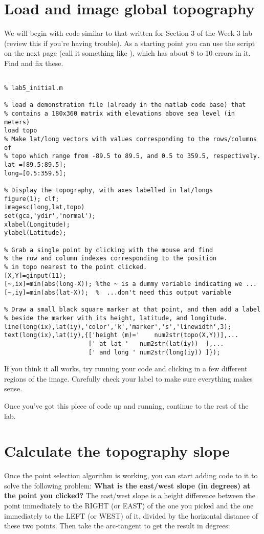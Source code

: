 \documentclass[letterpaper,12pt]{article}
\begin{document}
\section{Load and image global topography}
\label{sec:load}

We will begin with  code similar to that  written 
for Section 3 of the Week 3 lab (review this if you're having trouble). As a starting point you can
use the script  on the next page (call it something like ),
which has about 8 to 10 errors in it. Find and fix these.
\begin{lstlisting}

% lab5_initial.m

% load a demonstration file (already in the matlab code base) that
% contains a 180x360 matrix with elevations above sea level (in meters)
load topo
% Make lat/long vectors with values corresponding to the rows/columns of 
% topo which range from -89.5 to 89.5, and 0.5 to 359.5, respectively.
lat =[89.5:89.5];
long=[0.5:359.5];

% Display the topography, with axes labelled in lat/longs
figure(1); clf;
imagesc(long,lat,topo)
set(gca,'ydir','normal');
xlabel(Longitude);
ylabel(Latitude);

% Grab a single point by clicking with the mouse and find 
% the row and column indexes corresponding to the position 
% in topo nearest to the point clicked.
[X,Y]=ginput(11);
[~,ix]=min(abs(long-X)); %the ~ is a dummy variable indicating we ...
[~,iy]=min(abs(lat-X));  %  ...don't need this output variable

% Draw a small black square marker at that point, and then add a label 
% beside the marker with its height, latitude, and longitude.
line(long(ix),lat(iy),'color','k','marker','s','linewidth',3);
text(long(ix),lat(iy),{['height (m)='    num2str(topo(X,Y))],...
                       [' at lat '   num2str(lat(iy))  ],...
                       [' and long ' num2str(long(iy)) ]});
\end{lstlisting}



If you think it all works, try running your code and clicking in a few different regions of the image. Carefully 
check your label to make sure everything makes sense. 

Once you've got this piece of code up and running, 
continue to the rest of the lab.


\section{Calculate the topography slope}
\label{sec:slope}
Once the point selection algorithm is working, you can start adding code to it to solve
the following problem: {\bf What is the east/west slope (in degrees) at the point you clicked?} The 
east/west slope is a height
difference between the point immediately to the
RIGHT (or EAST) of the one you picked and the one immediately to the LEFT (or WEST) of it, divided 
by the horizontal distance of these two points. Then take the arc-tangent to get the result in degrees:
\end{document}
